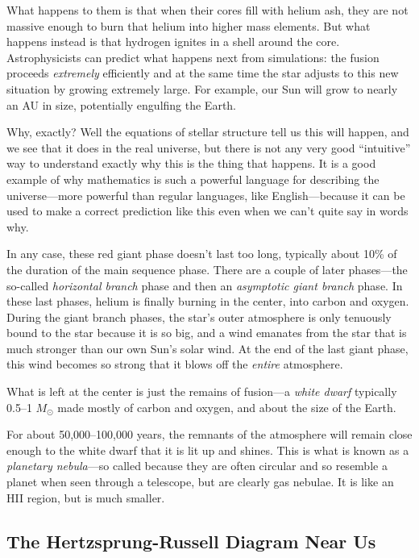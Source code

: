 \documentclass[12pt, preprint]{aastex}
\begin{document}
What happens to them is that when their cores fill with helium ash,
they are not massive enough to burn that helium into higher mass
elements. But what happens instead is that hydrogen ignites in a
shell around the core. Astrophysicists can predict what happens next
from simulations: the fusion proceeds {\it extremely} efficiently and
at the same time the star adjusts to this new situation by growing
extremely large. For example, our Sun will grow to nearly an AU in
size, potentially engulfing the Earth.

Why, exactly? Well the equations of stellar structure tell us this
will happen, and we see that it does in the real universe, but there
is not any very good ``intuitive'' way to understand exactly why this
is the thing that happens. It is a good example of why mathematics is
such a powerful language for describing the universe---more powerful
than regular languages, like English---because it can be used to make
a correct prediction like this even when we can't quite say in words
why.

In any case, these red giant phase doesn't last too long, typically
about 10\% of the duration of the main sequence phase. There are a
couple of later phases---the so-called {\it horizontal branch} phase
and then an {\it asymptotic giant branch} phase. In these last phases,
helium is finally burning in the center, into carbon and
oxygen. During the giant branch phases, the star's outer atmosphere is
only tenuously bound to the star because it is so big, and a wind
emanates from the star that is much stronger than our own Sun's solar
wind. At the end of the last giant phase, this wind becomes so strong
that it blows off the {\it entire} atmosphere.

What is left at the center is just the remains of fusion---a {\it
  white dwarf} typically 0.5--1 $M_\odot$ made mostly of carbon and
oxygen, and about the size of the Earth.

For about 50,000--100,000 years, the remnants of the atmosphere will
remain close enough to the white dwarf that it is lit up and
shines. This is what is known as a {\it planetary nebula}---so called
because they are often circular and so resemble a planet when seen
through a telescope, but are clearly gas nebulae. It is like an HII
region, but is much smaller. 

\subsection{The Hertzsprung-Russell Diagram Near Us}
\end{document}
